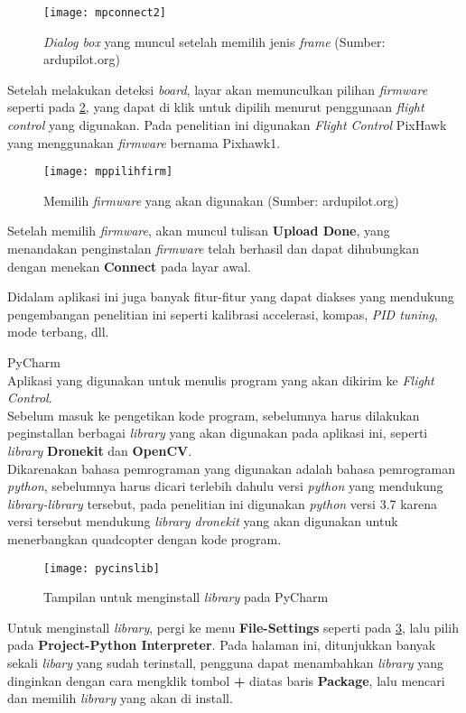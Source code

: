 \begin{packed_enum}
	\begin{figure}[H]
		\centering
		\texttt{[image: mpconnect2]}
		\caption{\textit{Dialog box} yang muncul setelah memilih jenis \textit{frame} (Sumber: ardupilot.org)}
		\label{fig:mpconnect2}
	\end{figure}
	
	Setelah melakukan deteksi \textit{board}, layar akan memunculkan pilihan \textit{firmware} seperti pada \cref{fig:mppilihfirm}, yang dapat di klik untuk dipilih menurut penggunaan \textit{flight control} yang digunakan. Pada penelitian ini digunakan \textit{Flight Control} PixHawk yang menggunakan \textit{firmware} bernama Pixhawk1.

	\begin{figure}[H]
		\centering
		\texttt{[image: mppilihfirm]}
		\caption{Memilih \textit{firmware} yang akan digunakan (Sumber: ardupilot.org)}
		\label{fig:mppilihfirm}
	\end{figure}
	
	Setelah memilih \textit{firmware}, akan muncul tulisan \textbf{Upload Done}, yang menandakan penginstalan \textit{firmware} telah berhasil dan dapat dihubungkan dengan menekan \textbf{Connect} pada layar awal.
	
	Didalam aplikasi ini juga banyak fitur-fitur yang dapat diakses yang mendukung pengembangan penelitian ini seperti kalibrasi accelerasi, kompas, \textit{PID tuning}, mode terbang, dll.
	
	\item PyCharm
	\\ Aplikasi yang digunakan untuk menulis program yang akan dikirim ke \textit{Flight Control}.
	\\ Sebelum masuk ke pengetikan kode program, sebelumnya harus dilakukan peginstallan berbagai \textit{library} yang akan digunakan pada aplikasi ini, seperti \textit{library} \textbf{Dronekit} dan \textbf{OpenCV}.
	\\ Dikarenakan bahasa pemrograman yang digunakan adalah bahasa pemrograman \textit{python}, sebelumnya harus dicari terlebih dahulu versi \textit{python} yang mendukung \textit{library-library} tersebut, pada penelitian ini digunakan \textit{python} versi 3.7 karena versi tersebut mendukung \textit{library dronekit} yang akan digunakan untuk menerbangkan quadcopter dengan kode program.
	
	\begin{figure}[H]
		\centering
		\texttt{[image: pycinslib]}
		\caption{Tampilan untuk menginstall \textit{library} pada PyCharm}
		\label{fig:pycinslib}
	\end{figure}
	
	Untuk menginstall \textit{library}, pergi ke menu \textbf{File-Settings} seperti pada \cref{fig:pycinslib}, lalu pilih pada \textbf{Project-Python Interpreter}. Pada halaman ini, ditunjukkan banyak sekali \textit{libary} yang sudah terinstall, pengguna dapat menambahkan \textit{library} yang dinginkan dengan cara mengklik tombol \textbf{+} diatas baris \textbf{Package}, lalu mencari dan memilih \textit{library} yang akan di install.
	
	
\end{packed_enum}

